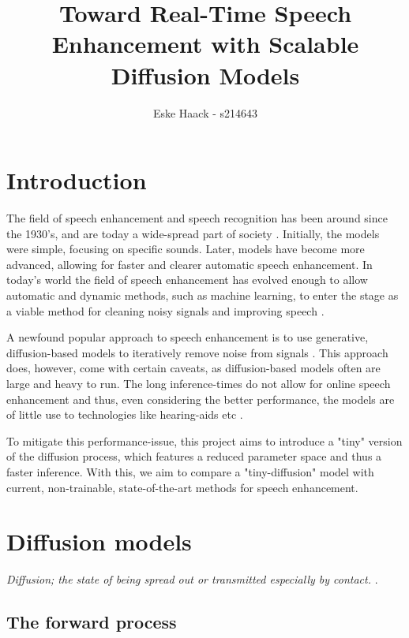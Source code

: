 \documentclass[a4paper, 12pt]{olplainarticle}
\title{Toward Real-Time Speech Enhancement with Scalable Diffusion Models}
\author[1]{Eske Haack - s214643}
\begin{document}
\flushbottom
\maketitle 
\thispagestyle{empty} 

\section*{Introduction}

The field of speech enhancement and speech recognition has been around since the 1930's, and are today a wide-spread part of society \citep{speech-history}. 
Initially, the models were simple, focusing on specific sounds. 
Later, models have become more advanced, allowing for faster and clearer automatic speech enhancement. 
In today's world the field of speech enhancement has evolved enough to allow automatic and dynamic methods, 
such as machine learning, to enter the stage as a viable method for cleaning noisy signals and improving speech \citep{tommy-base-paper}.

A newfound popular approach to speech enhancement is to use generative, 
diffusion-based models to iteratively remove noise from signals \citep{tommy-base-paper}. 
This approach does, however, come with certain caveats, as diffusion-based models often are large and heavy to run. 
The long inference-times do not allow for online speech enhancement and thus, even considering the better performance, 
the models are of little use to technologies like hearing-aids etc \citep{tommy-base-paper}.

To mitigate this performance-issue, this project aims to introduce a "tiny" version of the diffusion process, 
which features a reduced parameter space and thus a faster inference. 
With this, we aim to compare a "tiny-diffusion" model with current, non-trainable, 
state-of-the-art methods for speech enhancement.
 
\section*{Diffusion models}

\textit{Diffusion; the state of being spread out or transmitted especially by contact.} \citep{dictionary-diffusion}.

\subsection*{The forward process}
\end{document}
